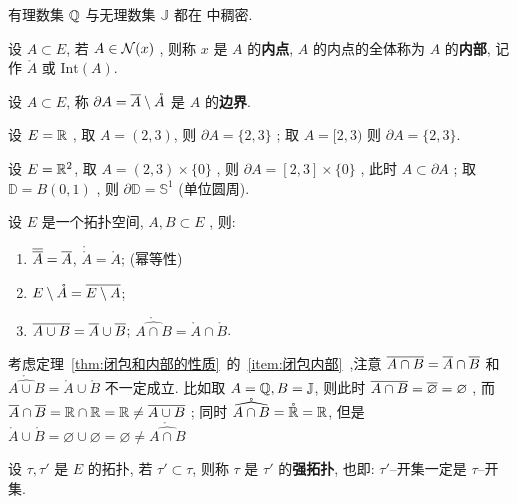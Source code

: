 	\begin{Example}
	   有理数集 $ \Q $ 与无理数集 $ \mathbb{J} $ 都在 \R 中稠密.
	\end{Example}
	\begin{Definition}[内部]\label{def:内部}
	   设 $ A\subset E $, 若 $ A\in\CN(x) $ , 则称 $ x $ 是 $ A $ 的\textbf{内点},  $ A $ 的内点的全体称为 $ A $ 的\textbf{内部}, 记作 $ \mathring{A} $ 或 $ \mathrm{Int}(A) $.
	\end{Definition}
	\begin{Definition}[边界]\label{def:边界}
	   设 $ A\subset E $, 称 $ \partial A = \baro{A}\sm\mathring{A} $ 是 $ A $ 的\textbf{边界}\index{B!边界}.
	\end{Definition}
	\begin{Example}
	   设 $ E=\R $ , 取 $ A = (2, 3) $, 则 $ \partial A = \{ 2, 3 \} $ ; 取 $ A = [2, 3) $ 则 $ \partial A = \{ 2, 3 \} $.

	   设 $ E = \R^{2} $, 取 $ A = (2, 3)\times \{0\} $ , 则 $ \partial A = [2, 3]\times \{0\} $ , 此时 $ A\subset \partial A $  ; 取 $ \mathbb{D}=B(0, 1) $ , 则 $ \partial \mathbb{D}=\mathbb{S}^{1} $ (单位圆周).
	\end{Example}
	\begin{Theorem}\label{thm:闭包和内部的性质}
	   设 $ E $ 是一个拓扑空间, $ A, B\subset E $ , 则:
	   \begin{enumerate}[(1)]
		  \item $ \baro{\baro{A}}=\baro{A} $, $ \mathring{\mathring{A}}=\mathring{A} $; (幂等性)
		  \item $ E\sm\mathring{A}=\overline{E\sm A} $;
		  \item \label{item:闭包内部}$ \overline {A\cup B}=\baro{A}\cup \baro{B} $; $ \mathring{\widehat{A\cap B}}=\mathring{A}\cap\mathring{B} $.
		\end{enumerate}
	\end{Theorem}
	\begin{Remark}
	   考虑定理~\ref{thm:闭包和内部的性质}~的~\ref{item:闭包内部}~,注意 $ \overline {A\cap B}=\baro{A}\cap \baro{B} $ 和 $ \mathring{\widehat{A\cup B}}=\mathring{A}\cup\mathring{B} $ 不一定成立. 比如取 $ A=\Q, B=\mathbb{J} $, 则此时 $ \overline{A\cap B}=\baro{\varnothing}=\varnothing $  , 而 $ \baro{A}\cap \baro{B}=\R\cap\R=\R\neq\overline {A\cup B} $ ; 同时 $ \mathring{\widehat{A\cap B}}=\mathring{\R}=\R $, 但是 $ \mathring{A}\cup\mathring{B}=\varnothing\cup\varnothing=\varnothing\neq \mathring{\widehat{A\cap B}} $
	\end{Remark}
	\begin{Definition}[拓扑比较]\label{def:拓扑比较}
	   设 $ \tau, \tau' $ 是 $ E $ 的拓扑, 若 $ \tau'\subset\tau $, 则称 $ \tau $ 是 $ \tau' $ 的\textbf{强拓扑}, 也即: $ \tau' $--开集一定是 $ \tau $--开集.
	\end{Definition}
